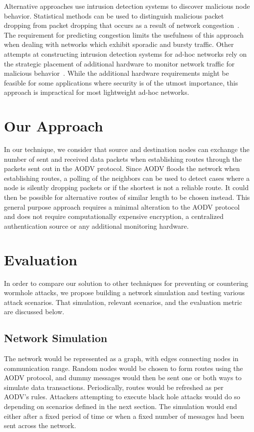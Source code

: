 \documentclass[12pt,a4paper]{report}
\begin{document}
Alternative approaches use intrusion detection systems to discover malicious node behavior. Statistical methods can be used to distinguish malicious packet dropping from packet dropping that occurs as a result of network congestion~\cite{1258776}. The requirement for predicting congestion limits the usefulness of this approach when dealing with networks which exhibit sporadic and bursty traffic. Other attempts at constructing intrusion detection systems for ad-hoc networks rely on the strategic placement of additional hardware to monitor network traffic for malicious behavior~\cite{Tseng:2003:SID:986858.986876}. While the additional hardware requirements might be feasible for some applications where security is of the utmost importance, this approach is impractical for most lightweight ad-hoc networks.

\section{Our Approach}
In our technique, we consider that source and destination nodes can exchange the number of sent and received data packets when establishing routes through the packets sent out in the AODV protocol. Since AODV floods the network when establishing routes, a polling of the neighbors can be used to detect cases where a node is silently dropping packets or if the shortest is not a reliable route.  It could then be possible for alternative routes of similar length to be chosen instead. This general purpose approach requires a minimal alteration to the AODV protocol and does not require computationally expensive encryption, a centralized authentication source or any additional monitoring hardware.

\section{Evaluation}
In order to compare our solution to other techniques for preventing or countering wormhole attacks, we propose building a network simulation and testing various attack scenarios. That simulation, relevant scenarios, and the evaluation metric are discussed below.

\subsection{Network Simulation}
The network would be represented as a graph, with edges connecting nodes in communication range. Random nodes would be chosen to form routes using the AODV protocol, and dummy messages would then be sent one or both ways to simulate data transactions. Periodically, routes would be refreshed as per AODV's rules. Attackers attempting to execute black hole attacks would do so depending on scenarios defined in the next section. The simulation would end either after a fixed period of time or when a fixed number of messages had been sent across the network.
\end{document}
